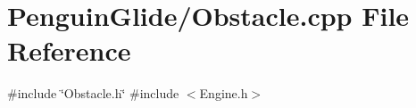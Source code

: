 \section{Penguin\+Glide/\+Obstacle.cpp File Reference}
\label{_obstacle_8cpp}
{\ttfamily \#include \char`\"{}Obstacle.\+h\char`\"{}}\newline
{\ttfamily \#include $<$Engine.\+h$>$}\newline
